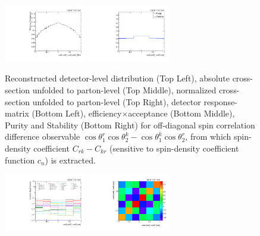 \begin{refsection}
\begin{figure}[htb]
\begin{center}
 \includegraphics[width=0.32\textwidth]{fig_fullRun2UL/unfolding/combined/TotEff_c_Mrk.pdf}
 \includegraphics[width=0.32\textwidth]{fig_fullRun2UL/unfolding/combined/PurStab_c_Mrk.pdf} \\
\caption{Reconstructed detector-level distribution (Top Left), absolute cross-section unfolded to parton-level (Top Middle), normalized cross-section unfolded to parton-level (Top Right), detector response-matrix (Bottom Left), efficiency$\times$acceptance (Bottom Middle), Purity and Stability (Bottom Right) for off-diagonal spin correlation difference observable $\cos\theta_{1}^{r}\cos\theta_{2}^{k}-\cos\theta_{1}^{k}\cos\theta_{2}^{r}$, from which spin-density coefficient $C_{rk}-C_{kr}$ (sensitive to spin-density coefficient function $c_n$) is extracted.}
\label{fig:c_Mrk}
\end{center}
\end{figure}
\clearpage
\begin{figure}[htb]
\begin{center}
 \includegraphics[width=0.32\textwidth]{fig_fullRun2UL/unfolding/combined/deltaSystCombinedlog_rebinnedB_c_Mrk.pdf}
 \includegraphics[width=0.32\textwidth]{fig_fullRun2UL/unfolding/combined/StatCovMatrix_rebinnedB_c_Mrk.pdf}

\end{center}
\end{figure}
\end{refsection}
